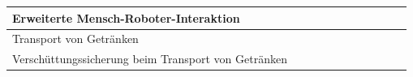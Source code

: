 \documentclass[
  a4paper,
  12pt,
  DIV=12,        %
  parskip=half,  %
  headings=small %
]{scrartcl}
\theoremstyle{definition}
\theoremstyle{definition}
\begin{document}
\begin{longtable}{@{}p{6cm}|p{1cm}p{1cm}p{1cm}p{1cm}p{1cm}@{}|ccccc@{}}
\toprule

Erweiterte Mensch-Roboter-Interaktion & \cellcolor[HTML]{EFEFEF} & \cellcolor[HTML]{EFEFEF} & \cellcolor[HTML]{EFEFEF} &  &  \\
\toprule

Transport von Getränken & \cellcolor[HTML]{EFEFEF} & \cellcolor[HTML]{EFEFEF} & \cellcolor[HTML]{EFEFEF} & \cellcolor[HTML]{EFEFEF} &  \\
\toprule

Verschüttungssicherung beim Transport von Getränken & \cellcolor[HTML]{EFEFEF} & \cellcolor[HTML]{EFEFEF} & \cellcolor[HTML]{EFEFEF} & \cellcolor[HTML]{EFEFEF} &  \\
\bottomrule %

\end{longtable}

\newpage
\end{document}
